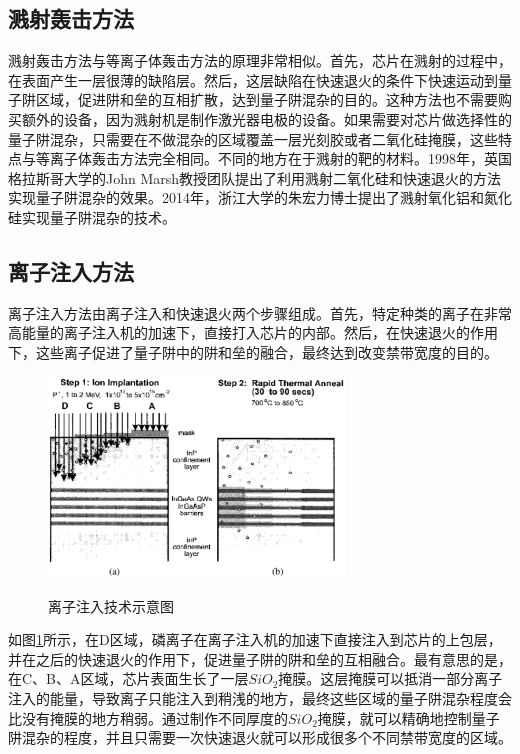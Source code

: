 \documentclass{ZJUthesis}
\begin{document}
\subsection{溅射轰击方法}

溅射轰击方法与等离子体轰击方法的原理非常相似。首先，芯片在溅射的过程中，在表面产生一层很薄的缺陷层。然后，这层缺陷在快速退火的条件下快速运动到量子阱区域，促进阱和垒的互相扩散，达到量子阱混杂的目的。这种方法也不需要购买额外的设备，因为溅射机是制作激光器电极的设备。如果需要对芯片做选择性的量子阱混杂，只需要在不做混杂的区域覆盖一层光刻胶或者二氧化硅掩膜，这些特点与等离子体轰击方法完全相同。不同的地方在于溅射的靶的材料。1998年，英国格拉斯哥大学的John Marsh教授团队提出了利用溅射二氧化硅和快速退火的方法实现量子阱混杂的效果\cite{mcdougall1998monolithic}。2014年，浙江大学的朱宏力博士提出了溅射氧化铝\cite{zhu2014quantum}和氮化硅\cite{zhu2014bandgap}实现量子阱混杂的技术。

\subsection{离子注入方法}

离子注入方法由离子注入和快速退火两个步骤组成。首先，特定种类的离子在非常高能量的离子注入机的加速下，直接打入芯片的内部。然后，在快速退火的作用下，这些离子促进了量子阱中的阱和垒的融合，最终达到改变禁带宽度的目的。

\begin{figure}[!htb]
  \centering
  \includegraphics[width=0.7\textwidth]{./Pictures/implantation.eps}\\
  \caption{离子注入技术示意图}
  \label{fig_implantation}
\end{figure}

如图\ref{fig_implantation}所示，在D区域，磷离子在离子注入机的加速下直接注入到芯片的上包层，并在之后的快速退火的作用下，促进量子阱的阱和垒的互相融合。最有意思的是，在C、B、A区域，芯片表面生长了一层$SiO_2$掩膜。这层掩膜可以抵消一部分离子注入的能量，导致离子只能注入到稍浅的地方，最终这些区域的量子阱混杂程度会比没有掩膜的地方稍弱。通过制作不同厚度的$SiO_2$掩膜，就可以精确地控制量子阱混杂的程度，并且只需要一次快速退火就可以形成很多个不同禁带宽度的区域。
\end{document}
